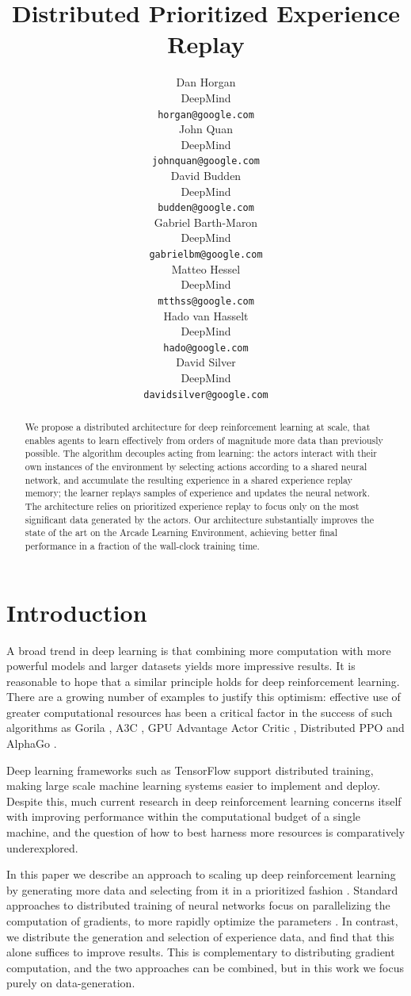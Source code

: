\documentclass{article} %
\title{Distributed Prioritized Experience Replay}
\author{Dan Horgan \\
DeepMind \\
\texttt{horgan@google.com} \\
\And
John Quan \\
DeepMind \\
\texttt{johnquan@google.com} \\
\And
David Budden \\
DeepMind \\
\texttt{budden@google.com} \\
\And
Gabriel Barth-Maron \\
DeepMind \\
\texttt{gabrielbm@google.com} \\
\And
Matteo Hessel \\
DeepMind \\
\texttt{mtthss@google.com} \\
\And
Hado van Hasselt \\
DeepMind \\
\texttt{hado@google.com} \\
\And
David Silver \\
DeepMind \\
\texttt{davidsilver@google.com} \\
}
\begin{document}
\maketitle

\begin{abstract}
We propose a distributed architecture for deep reinforcement learning at scale, that enables agents to learn effectively from orders of magnitude more data than previously possible. The algorithm decouples acting from learning: the actors interact with their own instances of the environment by selecting actions according to a shared neural network, and accumulate the resulting experience in a shared experience replay memory; the learner replays samples of experience and updates the neural network. The architecture relies on prioritized experience replay to focus only on the most significant data generated by the actors. Our architecture substantially improves the state of the art on the Arcade Learning Environment, achieving better final performance in a fraction of the wall-clock training time.
\end{abstract}


\section{Introduction}
A broad trend in deep learning is that combining more computation \citep{Dean:2012:LSD:2999134.2999271} with more powerful models \citep{DBLP:journals/corr/KaiserGSVPJU17} and larger datasets \citep{imagenet_cvpr09} yields more impressive results. It is reasonable to hope that a similar principle holds for deep reinforcement learning. There are a growing number of examples to justify this optimism: effective use of greater computational resources has been a critical factor in the success of such algorithms as Gorila \citep{gorila}, A3C \citep{a3c}, GPU Advantage Actor Critic \citep{ga3c}, Distributed PPO \citep{heess:dppo} and AlphaGo \citep{alphago}.

Deep learning frameworks such as TensorFlow \citep{tensorflow} support distributed training, making large scale machine learning systems easier to implement and deploy. Despite this, much current research in deep reinforcement learning concerns itself with improving performance within the computational budget of a single machine, and the question of how to best harness more resources is comparatively underexplored.

In this paper we describe an approach to scaling up deep reinforcement learning by generating more data and selecting from it in a prioritized fashion \citep{prioritized-replay}. Standard approaches to distributed training of neural networks focus on parallelizing the computation of gradients, to more rapidly optimize the parameters \citep{Dean:2012:LSD:2999134.2999271}. In contrast, we distribute the generation and selection of experience data, and find that this alone suffices to improve results. This is complementary to distributing gradient computation, and the two approaches can be combined, but in this work we focus purely on data-generation.
\end{document}
